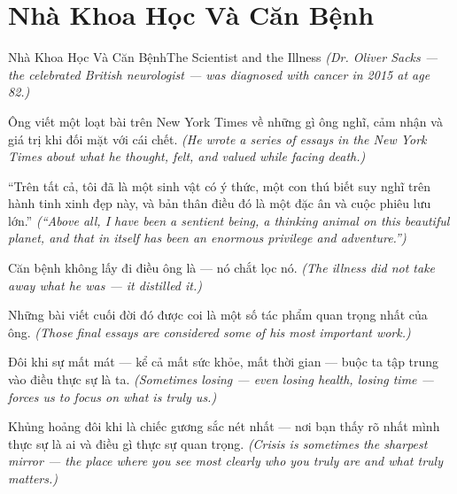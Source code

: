 \section{Nhà Khoa Học Và Căn Bệnh}
\begin{truyen}{Nhà Khoa Học Và Căn Bệnh}{The Scientist and the Illness}
\textit{(Dr. Oliver Sacks — the celebrated British neurologist — was diagnosed with cancer in 2015 at age 82.)}

Ông viết một loạt bài trên New York Times về những gì ông nghĩ, cảm nhận và giá trị khi đối mặt với cái chết.
\textit{(He wrote a series of essays in the New York Times about what he thought, felt, and valued while facing death.)}

``Trên tất cả, tôi đã là một sinh vật có ý thức, một con thú biết suy nghĩ trên hành tinh xinh đẹp này, và bản thân điều đó là một đặc ân và cuộc phiêu lưu lớn.''
\textit{(``Above all, I have been a sentient being, a thinking animal on this beautiful planet, and that in itself has been an enormous privilege and adventure.'')}

Căn bệnh không lấy đi điều ông là — nó chắt lọc nó.
\textit{(The illness did not take away what he was — it distilled it.)}

Những bài viết cuối đời đó được coi là một số tác phẩm quan trọng nhất của ông.
\textit{(Those final essays are considered some of his most important work.)}

Đôi khi sự mất mát — kể cả mất sức khỏe, mất thời gian — buộc ta tập trung vào điều thực sự là ta.
\textit{(Sometimes losing — even losing health, losing time — forces us to focus on what is truly us.)}

\end{truyen}

\begin{baihoc}
Khủng hoảng đôi khi là chiếc gương sắc nét nhất — nơi bạn thấy rõ nhất mình thực sự là ai và điều gì thực sự quan trọng.
\textit{(Crisis is sometimes the sharpest mirror — the place where you see most clearly who you truly are and what truly matters.)}
\end{baihoc}
\ngancach

